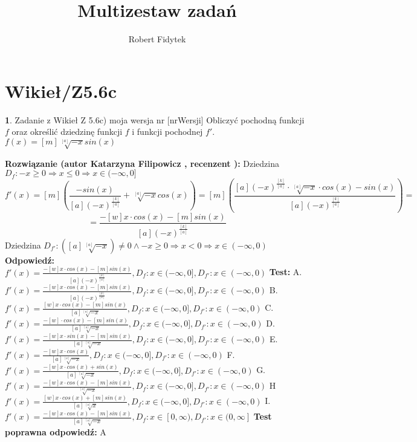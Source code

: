 \documentclass[12pt, a4paper]{article}
\title{Multizestaw zadań}
\author{Robert Fidytek}
\date{}
\theoremstyle{definition} %
\newtheorem{zad}{}
\newcommand{\kategoria}[1]{\section{#1}} %
\newcommand{\zadStart}[1]{\begin{zad}#1\newline} %
\newcommand{\zadStop}{\end{zad}}   %
\newcommand{\rozwStart}[2]{\noindent \textbf{Rozwiązanie (autor #1 , recenzent #2): }\newline} %
\newcommand{\rozwStop}{\newline}                                            %
\newcommand{\odpStart}{\noindent \textbf{Odpowiedź:}\newline}    %
\newcommand{\odpStop}{\newline}                                             %
\newcommand{\testStart}{\noindent \textbf{Test:}\newline} %
\newcommand{\testStop}{\newline} %
\newcommand{\kluczStart}{\noindent \textbf{Test poprawna odpowiedź:}\newline} %
\newcommand{\kluczStop}{\newline} %
\begin{document}
\maketitle


\kategoria{Wikieł/Z5.6c}
\zadStart{Zadanie z Wikieł Z 5.6c) moja wersja nr [nrWersji]}
Obliczyć pochodną funkcji $f$ oraz określić dziedzinę funkcji $f$ i funkcji pochodnej $f'$.\\
$f(x)=[m]\sqrt[[a]]{-x}sin(x)$
\zadStop
\rozwStart{Katarzyna Filipowicz}{}
Dziedzina $D_f: -x \geq 0 \Rightarrow x\leq 0 \Rightarrow x \in (-\infty,0]$
$$
f'(x)=[m]\left(\frac{-sin(x)}{[a](-x)^{\frac{[k]}{[a]}}}+\sqrt[[a]]{-x}cos(x)\right)=[m]\left(\frac{[a](-x)^{\frac{[k]}{[a]}}\cdot \sqrt[[a]]{-x} \cdot cos(x)-sin(x)}{[a](-x)^{\frac{[k]}{[a]}}}\right)=
$$  $$
=\frac{-[w] x\cdot cos(x)-[m]sin(x)}{[a](-x)^{\frac{[k]}{[a]}}}
$$
Dziedzina $D_{f'}: ([a]\sqrt[[a]]{-x}) \neq 0 \wedge -x\geq 0 \Rightarrow x < 0 \Rightarrow   x \in (-\infty,0)$
\rozwStop
\odpStart
$f'(x)=\frac{-[w] x\cdot cos(x)-[m]sin(x)}{[a](-x)^{\frac{[k]}{[a]}}}, D_f:x \in (-\infty,0], D_{f'}:x \in (-\infty,0)$
\odpStop
\testStart
A.$f'(x)=\frac{-[w] x\cdot cos(x)-[m]sin(x)}{[a](-x)^{\frac{[k]}{[a]}}}, D_f:x \in (-\infty,0], D_{f'}:x \in (-\infty,0)$
B.$f'(x)=\frac{[w] x\cdot cos(x)-[m]sin(x)}{[a]\sqrt[[a]]{-x}}, D_f:x \in (-\infty,0], D_{f'}:x \in (-\infty,0)$
C.$f'(x)=\frac{-[w]\cdot cos(x)-[m]sin(x)}{[a]\sqrt[[a]]{-x}}, D_f:x \in (-\infty,0], D_{f'}:x \in (-\infty,0)$
D.$f'(x)=\frac{-[w] x\cdot sin(x)-[m]sin(x)}{[a]\sqrt[[a]]{-x}}, D_f:x \in (-\infty,0], D_{f'}:x \in (-\infty,0)$
E.$f'(x)=\frac{-[w] x\cdot cos(x)}{[a]\sqrt[[a]]{-x}}, D_f:x \in (-\infty,0], D_{f'}:x \in (-\infty,0)$
F.$f'(x)=\frac{-[w] x\cdot cos(x)+sin(x)}{[a]\sqrt[[a]]{-x}}, D_f:x \in (-\infty,0], D_{f'}:x \in (-\infty,0)$
G.$f'(x)=\frac{-[w] x\cdot cos(x)-[m]sin(x)}{\sqrt[[a]]{-x}}, D_f:x \in (-\infty,0], D_{f'}:x \in (-\infty,0)$
H$f'(x)=\frac{[w] x\cdot cos(x)+[m]sin(x)}{[a]\sqrt[[a]]{x}}, D_f:x \in (-\infty,0], D_{f'}:x \in (-\infty,0)$
I.$f'(x)=\frac{-[w] x\cdot cos(x)-[m]sin(x)}{[a]\sqrt[[a]]{-x}}, D_f:x \in [0,\infty), D_{f'}:x \in (0,\infty]$
\testStop
\kluczStart
A
\kluczStop
\end{document}
